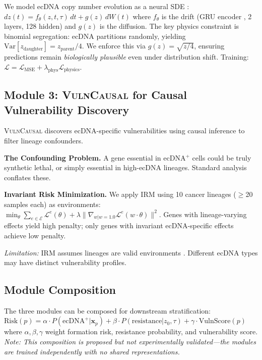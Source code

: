 \documentclass[runningheads]{llncs}
\newcommand{\vulncausal}{\textsc{VulnCausal}}
\begin{document}
We model ecDNA copy number evolution as a neural SDE \cite{li_2020_neuralsde}:
$dz(t) = f_\theta(z, t, \tau) \, dt + g(z) \, dW(t)$
where $f_\theta$ is the drift (GRU encoder \cite{cho_2014_gru}, 2 layers, 128 hidden) and $g(z)$ is the diffusion. The key physics constraint is binomial segregation: ecDNA partitions randomly, yielding $\text{Var}[z_{\text{daughter}}] = z_{\text{parent}}/4$. We enforce this via $g(z) = \sqrt{z/4}$, ensuring predictions remain \textit{biologically plausible} even under distribution shift. Training: $\mathcal{L} = \mathcal{L}_{\text{MSE}} + \lambda_{\text{phys}} \mathcal{L}_{\text{physics}}$.

\subsection{Module 3: \vulncausal{} for Causal Vulnerability Discovery}

\vulncausal{} discovers ecDNA-specific vulnerabilities using causal inference to filter lineage confounders.

\textbf{The Confounding Problem.} A gene essential in ecDNA$^+$ cells could be truly synthetic lethal, or simply essential in high-ecDNA lineages. Standard analysis conflates these.

\textbf{Invariant Risk Minimization.} We apply IRM \cite{arjovsky_2019_irm} using 10 cancer lineages ($\geq$20 samples each) as environments:
$\min_\theta \sum_{e \in \mathcal{E}} \mathcal{L}^e(\theta) + \lambda \|\nabla_{w|w=1.0} \mathcal{L}^e(w \cdot \theta)\|^2$.
Genes with lineage-varying effects yield high penalty; only genes with invariant ecDNA-specific effects achieve low penalty.

\textit{Limitation:} IRM assumes lineages are valid environments \cite{rosenfeld_2021_irm_risks}. Different ecDNA types may have distinct vulnerability profiles.

\subsection{Module Composition}

The three modules can be composed for downstream stratification:
$\text{Risk}(p) = \alpha \cdot P(\text{ecDNA}^+ | \mathbf{x}_p) + \beta \cdot P(\text{resistance} | z_0, \tau) + \gamma \cdot \text{VulnScore}(p)$
where $\alpha, \beta, \gamma$ weight formation risk, resistance probability, and vulnerability score. \textit{Note: This composition is proposed but not experimentally validated---the modules are trained independently with no shared representations.}
\end{document}
